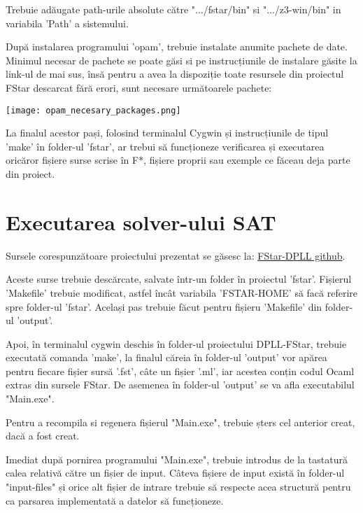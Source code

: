 Trebuie adăugate path-urile absolute către ".../fstar/bin" si ".../z3-win/bin" in variabila 'Path' a sistemului.

După instalarea programului 'opam', trebuie instalate anumite pachete de date. Minimul necesar de pachete se poate găsi si pe instrucțiunile de instalare găsite la link-ul de mai sus, însă pentru a avea la dispoziție toate resursele din proiectul FStar descarcat fără erori, sunt necesare următoarele pachete: 
\newline

\texttt{[image: opam\_necesary\_packages.png]}
\newline

La finalul acestor pași, folosind terminalul Cygwin și instrucțiunile de tipul 'make' în folder-ul 'fstar', ar trebui să funcționeze verificarea și executarea oricăror fișiere surse scrise în F*, fișiere proprii sau exemple ce făceau deja parte din proiect.

\newpage

\section{Executarea solver-ului SAT}

Sursele corespunzătoare proiectului prezentat se găsesc la:
\href{https://github.com/alex4482/FStar-DPLL-licenta/tree/main/dpll_optimized}{FStar-DPLL github}.

Aceste surse trebuie descărcate, salvate într-un folder în proiectul 'fstar'. \newline Fișierul 'Makefile' trebuie modificat, astfel încât variabila 'FSTAR-HOME'  să facă \newline referire spre folder-ul 'fstar'. Același pas trebuie făcut pentru fișieru 'Makefile' din \newline folder-ul 'output'.

Apoi, în terminalul cygwin deschis în folder-ul proiectului DPLL-FStar, trebuie executată comanda 'make', la finalul căreia în folder-ul 'output' vor apărea pentru \newline fiecare fișier sursă '.fst', câte un fișier '.ml', iar acestea conțin codul Ocaml extras din sursele FStar. De asemenea în folder-ul 'output' se va afla executabilul "Main.exe".

Pentru a recompila si regenera fișierul "Main.exe", trebuie șters cel anterior creat, dacă a fost creat.

Imediat după pornirea programului "Main.exe", trebuie introdus de la tastatură calea relativă către un fișier de input. Câteva fișiere de input există în folder-ul \newline "input-files" și orice alt fișier de intrare trebuie să respecte acea structură pentru ca parsarea implementată a datelor să funcționeze.

